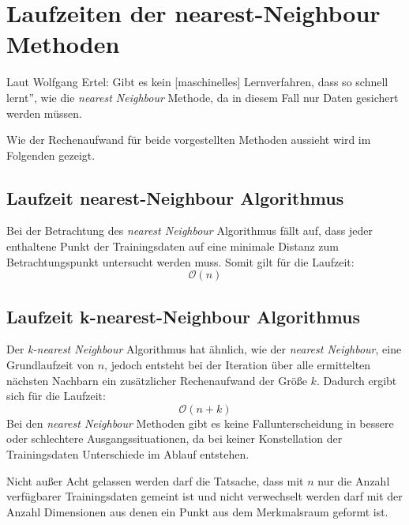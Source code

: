 \documentclass[fontsize=11pt]{scrartcl}
\begin{document}
                         
        \section{Laufzeiten der nearest-Neighbour Methoden}
        \label{sec:laufzeit}
            Laut Wolfgang Ertel: \glqq Gibt es kein [maschinelles] Lernverfahren, dass so schnell lernt”\grqq \cite[S. 213]{ertel2016}, wie die \emph{nearest Neighbour} Methode, da in diesem Fall nur Daten gesichert werden müssen.\par
            Wie der Rechenaufwand für beide vorgestellten Methoden aussieht wird im Folgenden gezeigt.
                        
            \subsection{Laufzeit nearest-Neighbour Algorithmus}
                Bei der Betrachtung des \emph{nearest Neighbour} Algorithmus fällt auf, dass jeder enthaltene Punkt der Trainingsdaten auf eine minimale Distanz zum Betrachtungspunkt untersucht werden muss. Somit gilt für die Laufzeit:
                $$
                    \mathcal{O}(n)
                $$   
            
            \subsection{Laufzeit        k-nearest-Neighbour Algorithmus}
                Der \emph{k-nearest Neighbour} Algorithmus hat ähnlich, wie der \emph{nearest Neighbour}, eine Grundlaufzeit von $n$, jedoch entsteht bei der Iteration über alle ermittelten nächsten Nachbarn ein zusätzlicher Rechenaufwand der Größe $k$. Dadurch ergibt sich für die Laufzeit:
                $$
                    \mathcal{O}(n+k)
                $$
                Bei den \emph{nearest Neighbour} Methoden gibt es keine Fallunterscheidung in bessere oder schlechtere Ausgangssituationen, da bei keiner Konstellation der Trainingsdaten Unterschiede im Ablauf entstehen. \par
                Nicht außer Acht gelassen werden darf die Tatsache, dass mit $n$ nur die Anzahl verfügbarer Trainingsdaten gemeint ist und nicht verwechselt werden darf mit der Anzahl Dimensionen aus denen ein Punkt aus dem Merkmalsraum geformt ist.  


    \newpage

    
    
\end{document}
